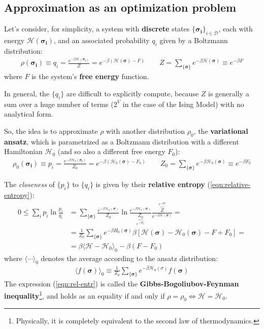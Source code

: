 \documentclass[../../main.tex]{subfiles}
\begin{document}
\subsection{Approximation as an optimization problem}
Let's consider, for simplicity, a system with \textbf{discrete} states $\{\bm{\sigma_i}\}_{i \in \mathcal{D}}$, each with energy $\mathcal{H}(\bm{\sigma_i})$, and an associated probability $q_i$ given by a Boltzmann distribution:
\begin{align*}
    \rho(\bm{\sigma_i}) \equiv q_i = \frac{e^{-\beta \mathcal{H}(\bm{\sigma_i})}}{Z} = e^{-\beta(\mathcal{H}(\bm{\sigma})-F)} \qquad Z = \sum_{\{\bm{\sigma}\}} e^{-\beta \mathcal{H}(\bm{\sigma})}\equiv e^{-\beta F}
\end{align*}
where $F$ is the system's \textbf{free energy} function.

\medskip

In general, the $\{q_i\}$ are difficult to explicitly compute, because $Z$ is generally a sum over a huge number of terms ($2^V$ in the case of the Ising Model) with no analytical form.

\medskip

So, the idea is to approximate $\rho$ with another  distribution $\rho_0$, the \textbf{variational ansatz}, which is parametrized as a Boltzmann distribution with a different Hamiltonian $\mathcal{H}_0$ (and so also a different free energy $F_0$):
\begin{align}\label{eqn:variational-ansatz}
    \rho_0(\bm{\sigma_i}) \equiv p_i = \frac{e^{-\beta \mathcal{H}_0(\bm{\sigma_i})}}{Z_0} = e^{-\beta(\mathcal{H}_0(\bm{\sigma})-F_0)} \qquad Z_0 = \sum_{\{\bm{\sigma}\}} e^{-\beta \mathcal{H}_0(\bm{\sigma})} \equiv e^{-\beta F_0}
\end{align}

The \textit{closeness} of $\{p_i\}$ to $\{q_i\}$ is given by their \textbf{relative entropy} (\ref{eqn:relative-entropy}):
\begin{align} \nonumber
    0 \leq \sum_i p_i \ln \frac{p_i}{q_i} &= \sum_{\{\bm{\sigma}\}} \frac{e^{-\beta \mathcal{H}_0 (\bm{\sigma})}}{Z_0} \ln \frac{e^{-\beta \mathcal{H}_0(\bm{\sigma}) }}{\underbrace{Z_0}_{e^{-\beta F_0}} } \frac{\overbrace{Z}^{e^{-\beta F}} }{e^{-\beta \mathcal{H}(\bm{\sigma})}}  = \\
    &=  \nonumber
    \frac{1}{Z_0} \sum_{\{\bm{\sigma}\}} e^{-\beta H_0(\bm{\sigma})} \beta[\mathcal{H}(\bm{\sigma}) - \mathcal{H}_0(\bm{\sigma}) - F + F_0] =\\
    &= \beta \langle \mathcal{H}-\mathcal{H}_0 \rangle_0 - \beta (F-F_0) \label{eqn:rel-entr}
\end{align} 
where $\langle \cdots \rangle_0$ denotes the average according to the ansatz distribution:
\begin{align*}
    \langle f(\bm{\sigma}) \rangle_0 \equiv \frac{1}{Z_0} \sum_{\{\bm{\sigma}\}} e^{-\beta \mathcal{H}_0(\sigma)} f(\bm{\sigma})
\end{align*}
The expression (\ref{eqn:rel-entr}) is called the \textbf{Gibbs-Bogoliubov-Feynman inequality}\footnote{Physically, it is completely equivalent to the second law of thermodynamics.}, and holds as an equality if and only if $\rho = \rho_0 \Leftrightarrow \mathcal{H} = \mathcal{H}_0$. 
\end{document}
